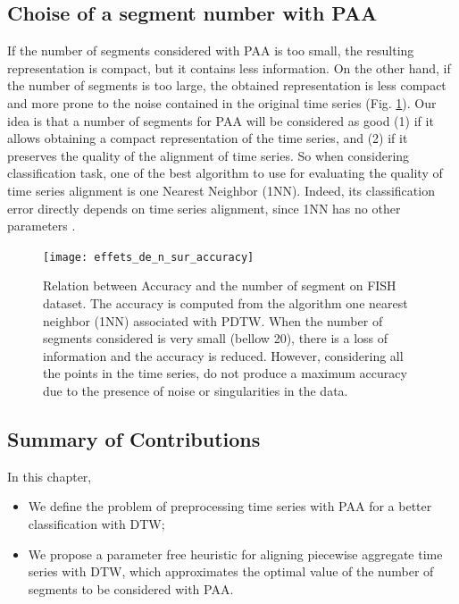 \subsection{Choise of a segment number with PAA}

If the number of segments considered with PAA is too small, the resulting
representation  is compact, but it contains less information. On the other hand, if the number of
segments is too large, the obtained representation  is less compact and more prone to the noise
contained in the original time series (Fig. \ref{relation_nb_acc}). Our idea is that a number of
segments for PAA will be considered as good (1) if it allows obtaining a compact representation of the
time series, and (2) if it preserves the quality of the alignment of time series. So when
considering classification task, one of the best algorithm to use for
evaluating the quality of time series alignment is one Nearest Neighbor (1NN).   
Indeed, its classification error directly depends on time series alignment, since 1NN has no other
parameters \cite{wang2013experimental}.


\begin{figure}
\center
\texttt{[image: effets\_de\_n\_sur\_accuracy]}
\caption{Relation between Accuracy and the number of segment on FISH dataset. The accuracy is computed from the algorithm one nearest neighbor (1NN) associated with PDTW. When the number of segments
considered is very small (bellow 20), there is a loss of information and the accuracy is reduced. However, considering all the points in the time series, do not produce a maximum accuracy due to the presence of noise or singularities \cite{Keogh_Pazzani_2001}  in the data. }
\label{relation_nb_acc}
\end{figure}

\subsection{Summary of Contributions}

In this chapter, 
\begin{itemize}
\item We define the problem of preprocessing time series with PAA for a better classification with
DTW;
\item We propose a parameter free heuristic for aligning piecewise aggregate time series with DTW, which approximates the optimal value of the number of segments to be considered with PAA. 
\end{itemize}

